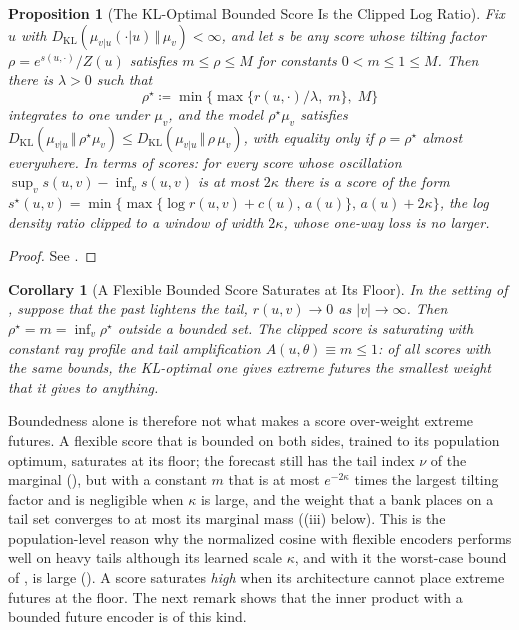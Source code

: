 \documentclass[11pt]{article}
\theoremstyle{plain}
\newtheorem{proposition}[theorem]{Proposition}
\newtheorem{corollary}[theorem]{Corollary}
\theoremstyle{definition}
\theoremstyle{remark}
\newcommand{\define}{\coloneqq}
\newcommand{\KL}[2]{D_{\mathrm{KL}}\!\left(#1\,\Vert\,#2\right)}
\newcommand{\abs}[1]{\left\lvert #1 \right\rvert}
\begin{document}
\begin{proposition}[The KL-Optimal Bounded Score Is the Clipped Log Ratio]
 \label{prop:clip}
 Fix $u$ with $\KL{\mu_{v\vert u}(\cdot\vert u)}{\mu_v}<\infty$, and let $s$ be
 any score whose tilting factor $\rho=e^{s(u,\cdot)}/Z(u)$ satisfies
 $m\le\rho\le M$ for constants $0<m\le1\le M$. Then there is $\lambda>0$ such
 that
 \begin{equation}
  \rho^{\star}\define\min\bigl\{\max\{r(u,\cdot)/\lambda,\;m\},\;M\bigr\}
  \label{eq:clip}
 \end{equation}
 integrates to one under $\mu_v$, and the model $\rho^{\star}\mu_v$ satisfies
 $\KL{\mu_{v\vert u}}{\rho^{\star}\mu_v}\le\KL{\mu_{v\vert u}}{\rho\,\mu_v}$,
 with equality only if $\rho=\rho^{\star}$ almost everywhere. In terms of
 scores: for every score whose oscillation $\sup_vs(u,v)-\inf_vs(u,v)$ is at
 most $2\kappa$ there is a score of the form
 $s^{\star}(u,v)=\min\{\max\{\log r(u,v)+c(u),\,a(u)\},\,a(u)+2\kappa\}$, the
 log density ratio clipped to a window of width $2\kappa$, whose one-way loss
 is no larger.
\end{proposition}
\begin{proof}
 See .
\end{proof}

\begin{corollary}[A Flexible Bounded Score Saturates at Its Floor]
 \label{cor:floor}
 In the setting of , suppose that the past lightens the tail,
 $r(u,v)\to0$ as $\abs{v}\to\infty$. Then $\rho^{\star}=m=\inf_v\rho^{\star}$
 outside a bounded set. The clipped score is saturating with constant ray
 profile and tail amplification $A(u,\theta)\equiv m\le1$: of all scores with
 the same bounds, the KL-optimal one gives extreme futures the smallest
 weight that it gives to anything.
\end{corollary}

Boundedness alone is therefore not what makes a score over-weight extreme
futures. A flexible score that is bounded on both sides, trained to its
population optimum, saturates at its floor; the forecast still has the tail
index $\nu$ of the marginal (), but with a constant $m$
that is at most $e^{-2\kappa}$ times the largest tilting factor and is
negligible when $\kappa$ is large, and the weight that a bank places on a tail
set converges to at most its marginal mass ((iii) below). This is the population-level reason why the normalized cosine
with flexible encoders performs well on heavy tails although its learned
scale $\kappa$, and with it the worst-case bound of , is
large (). A score saturates \emph{high}
when its architecture cannot place extreme futures at the floor. The next
remark shows that the inner product with a bounded future encoder is of this
kind.
\end{document}
